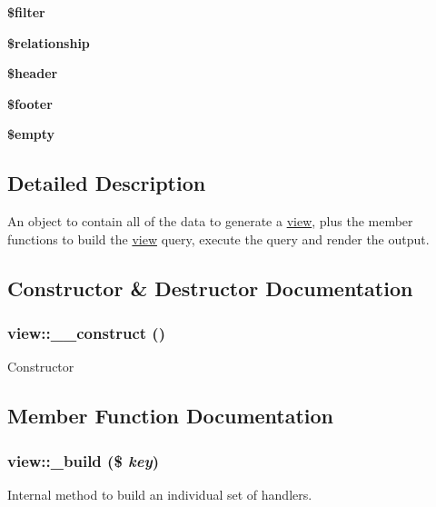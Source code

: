 \begin{DoxyCompactItemize}
\item 
\hypertarget{classview_a716398141eb2a1f084c7519224eab875}{
{\bfseries \$filter}}
\label{classview_a716398141eb2a1f084c7519224eab875}

\item 
\hypertarget{classview_a42622affa4c938f795c1e1622e4e2a19}{
{\bfseries \$relationship}}
\label{classview_a42622affa4c938f795c1e1622e4e2a19}

\item 
\hypertarget{classview_a2c6d713ee3ec6cd0d4434f2305383b58}{
{\bfseries \$header}}
\label{classview_a2c6d713ee3ec6cd0d4434f2305383b58}

\item 
\hypertarget{classview_ae75d38840f9e664112e15b721f8090d3}{
{\bfseries \$footer}}
\label{classview_ae75d38840f9e664112e15b721f8090d3}

\item 
\hypertarget{classview_ad0556efc25a38146828328c1fb5ea067}{
{\bfseries \$empty}}
\label{classview_ad0556efc25a38146828328c1fb5ea067}

\end{DoxyCompactItemize}


\subsection{Detailed Description}
An object to contain all of the data to generate a \hyperlink{classview}{view}, plus the member functions to build the \hyperlink{classview}{view} query, execute the query and render the output. 

\subsection{Constructor \& Destructor Documentation}
\hypertarget{classview_ab7ff00930c1773ddc3e1497b57543e04}{
\subsubsection[{\_\-\_\-construct}]{\setlength{\rightskip}{0pt plus 5cm}view::\_\-\_\-construct ()}}
\label{classview_ab7ff00930c1773ddc3e1497b57543e04}
Constructor 

\subsection{Member Function Documentation}
\hypertarget{classview_a85b835ebd83d4e84bf4fbda3829ce12b}{
\subsubsection[{\_\-build}]{\setlength{\rightskip}{0pt plus 5cm}view::\_\-build (\$ {\em key})}}
\label{classview_a85b835ebd83d4e84bf4fbda3829ce12b}
Internal method to build an individual set of handlers.



